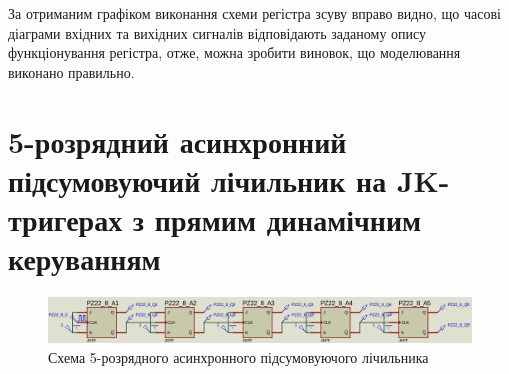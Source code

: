 \documentclass{article}
\begin{document}
\begin{normalsize}
За отриманим графіком виконання схеми регістра зсуву вправо видно, що часові діаграми вхідних та вихідних сигналів відповідають заданому опису функціонування регістра, отже, можна зробити виновок, що моделювання виконано правильно.

	\begin{figure}[H]
		\centering
		\hspace{5px}
	\end{figure}

	\section*{5-розрядний асинхронний підсумовуючий лічильник на JK-тригерах з прямим динамічним керуванням}	
	\begin{figure}[H]
		\centering
		\includegraphics[scale=0.25]{s3}	
		\caption{Схема 5-розрядного асинхронного підсумовуючого лічильника}
	\end{figure}
	

\end{normalsize}
\end{document}
